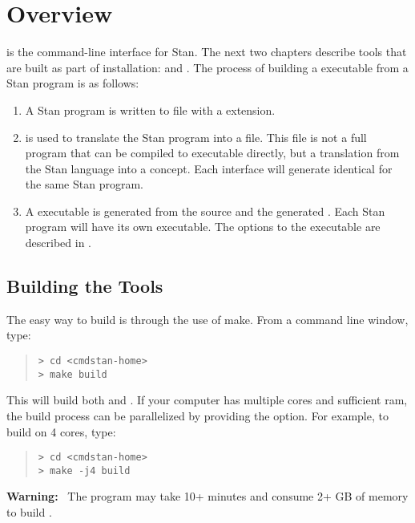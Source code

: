\chapter{Overview}

\noindent
\CmdStan is the command-line interface for Stan. The next two
chapters describe tools that are built as part of \CmdStan
installation:  and . The process of building a
\CmdStan executable from a Stan program is as follows:
%
\begin{enumerate}
  \item A Stan program is written to file with a 
    extension.
  \item {} is used to translate the Stan program into a
    \Cpp file. This \Cpp file is not a full program that can be
    compiled to executable directly, but a translation from the Stan
    language into a \Cpp concept. Each interface will generate identical
    \Cpp for the same Stan program.
  \item A \CmdStan executable is generated from the \CmdStan source
    and the generated \Cpp. Each Stan program will have its own
    \CmdStan executable. The options to the \CmdStan executable are
    described in .
\end{enumerate}


\section{Building the \CmdStan Tools}\label{build.section}

The easy way to build \CmdStan is through the use of make. From a
command line window, type:
%
\begin{quote}
\begin{Verbatim}[fontshape=sl,fontsize=\small]
> cd <cmdstan-home>
> make build
\end{Verbatim}
\end{quote}
%
This will build both  and . If your computer
has multiple cores and sufficient ram, the build process can be parallelized
by providing the  option. For example, to build on 4 cores, type:
%
\begin{quote}
\begin{Verbatim}[fontshape=sl,fontsize=\small]
> cd <cmdstan-home>
> make -j4 build
\end{Verbatim}
\end{quote}
%
\textbf{Warning:} \ The  program may take 10+ minutes and
consume 2+ GB of memory to build \CmdStan.
